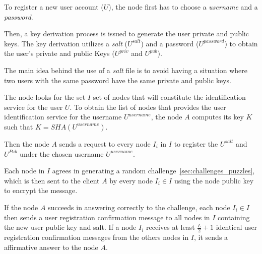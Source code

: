 To register a new user account ($U$), the node first
has to choose a \textit{username} and a \textit{password}.
% 
% 

Then, a key derivation process is issued to generate the user private and
public keys. The
key derivation utilizes a \textit{salt} ($U^{salt}$) and a password ($U^{password}$) to
obtain the user's private and public Keys
($U^{priv}$ and $U^{pub}$).

The main idea behind the use of a \textit{salt} file is to avoid having a
situation where two users with the same password have the same private and
public keys.

The node  looks for the set $I$ set of nodes that will constitute the
identification service for the user $U$. To obtain the list of nodes that provides the user identification service for
the username $U^{username}$, the node $A$ computes its key $K$ such that $K =
SHA(U^{username})$. 

Then the node $A$ sends a request to every node $I_i$ in $I$ to register the
$U^{salt}$ and $U^{Pub}$ under the chosen  username  $U^{username}$.

Each node in $I$ agrees in generating a random challenge~\ref{sec:challenges_puzzles}, which is then sent to the
client $A$ by every node $I_i \in I$ using the node public key to encrypt the
message.

If the node $A$ succeeds in answering correctly to the challenge, each node $I_i \in I$ then sends a user registration confirmation message to all nodes
in $I$ containing the new user public key and salt. If a node $I_i$ receives at
least $\frac{L}{2} + 1$ identical user registration confirmation messages from
the others nodes in $I$, it sends a affirmative answer to the node $A$.


